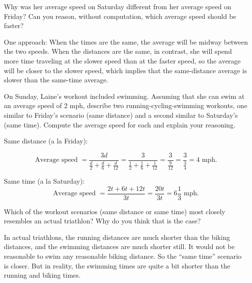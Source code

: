 \begin{prob}
Why was her average speed on Saturday different from her average speed on Friday?  Can you reason, without computation, which average speed should be faster?  
\end{prob}

\begin{teachingnote}
One approach:  When the times are the same, the average will be midway between the two speeds.  When the distances are the same, in contrast, she will spend more time traveling at the slower speed than at the faster speed, so the average will be closer to the slower speed, which implies that the same-distance average is slower than the same-time average.  
\end{teachingnote}

\begin{prob} On Sunday, Laine's workout included swimming.  Assuming that she can swim at an average speed of 2 mph, describe two running-cycling-swimming workouts, one similar to Friday's scenario (same distance) and a second similar to Saturday's (same time).  Compute the average speed for each and explain your reasoning.  
\end{prob}

\begin{teachingnote}
Same distance (a la Friday):  

$$\text{Average speed } = \frac{3d}{\frac{d}{2}+\frac{d}{6}+\frac{d}{12}}=\frac{3}{\frac{1}{2}+\frac{1}{6}+\frac{1}{12}}=\frac{3}{\frac{9}{12}}=\frac{3}{\frac{3}{4}}=4  \text{ mph.}$$

Same time (a la Saturday):  $$\text{Average speed } = \frac{2t+6t+12t}{3t}=\frac{20t}{3t}=6\frac{1}{3} \text{ mph.}$$
\end{teachingnote}

\begin{prob}
Which of the workout scenarios (same distance or same time) most closely resembles an actual triathlon?  Why do you think that is the case?
\end{prob}

\begin{teachingnote}
In actual triathlons, the running distances are much shorter than the biking distances, and the swimming distances are much shorter still.  It would not be reasonable to swim any reasonable biking distance.  So the ``same time'' scenario is closer.  But in reality, the swimming times are quite a bit shorter than the running and biking times.  
\end{teachingnote}

